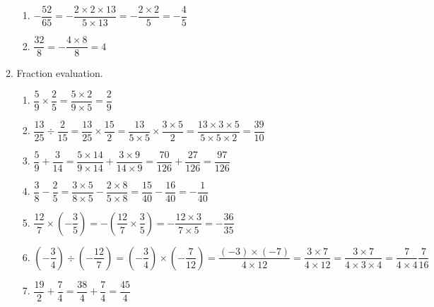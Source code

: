 \documentclass[fleqn]{article}
\begin{document}
\begin{enumerate}[label=\textbf{\arabic*.},labelsep=2em]
\begin{enumerate}[label=\textbf{\arabic*.},labelsep=2em]
\begin{enumerate}[label=\textbf{(\alph*)},labelsep=2em]
\item $ -\dfrac{52}{65} = -\dfrac{2 \times 2 \times 13}{5 \times 13} = -\dfrac{2 \times 2}{5} = -\dfrac{4}{5} $

\item $ \dfrac{32}{8} = -\dfrac{4 \times 8}{8} = 4 $

\end{enumerate}

\item
Fraction evaluation.

\begin{enumerate}[label=\textbf{(\alph*)},labelsep=2em]

\item 
$ 
	\dfrac{5}{9} \times \dfrac{2}{5} = 
	\dfrac{5 \times 2}{ 9 \times 5} = 
	\dfrac{2}{9}
$

\item 
$ 
	\dfrac{13}{25} \div \dfrac{2}{15} = 
	\dfrac{13}{25} \times \dfrac{15}{2} =
	\dfrac{13}{5 \times 5} \times \dfrac{3 \times 5}{2} = 
	\dfrac{13 \times 3 \times 5}{5 \times 5 \times 2} = 
	\dfrac{39}{10}
$

\item
$
	\dfrac{5}{9} + \dfrac{3}{14} =
	\dfrac{5 \times 14}{9 \times 14} + \dfrac{3 \times 9}{14 \times 9} =
	\dfrac{70}{126} + \dfrac{27}{126} =
	\dfrac{97}{126}
$

\item
$
	\dfrac{3}{8} - \dfrac{2}{5} =
	\dfrac{3 \times 5}{8 \times 5} - \dfrac{2 \times 8}{5 \times 8}=
	\dfrac{15}{40} - \dfrac{16}{40} =
	- \dfrac{1}{40}
$

\item
$
	\dfrac{12}{7} \times \left( - \dfrac{3}{5} \right) =
	- \left( \dfrac{12}{7} \times \dfrac{3}{5} \right) =
	- \dfrac{12 \times 3}{7 \times 5} =
	- \dfrac{36}{35}
$

\item
$
	\left( -\dfrac{3}{4} \right) \div \left( -\dfrac{12}{7} \right) =
	\left( -\dfrac{3}{4} \right) \times \left( -\dfrac{7}{12} \right) =
	\dfrac {(-3) \times (-7)}{4 \times 12} =
	\dfrac {3 \times 7}{4 \times 12} =
	\dfrac{3 \times 7}{4 \times 3 \times 4} = 
	\dfrac{7}{4 \times 4}
	\dfrac{7}{16}
$

\item
$
	\dfrac{19}{2} + \dfrac{7}{4} =
	\dfrac{38}{4} + \dfrac{7}{4} =
	\dfrac{45}{4}
$

\end{enumerate}

\end{enumerate} %

\end{enumerate}
\end{document}
